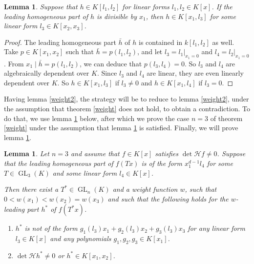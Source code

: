 \documentclass[10pt]{article}
\newtheorem{lemma}[theorem]{Lemma}
\theoremstyle{remark}
\theoremstyle{definition}
\newcommand{\hess}{{\mathcal H}}
\newcommand{\GL}{\operatorname{GL}}
\begin{document}
\begin{lemma} \label{xkdiv}
Suppose that $h \in K[l_1,l_2]$ for linear forms $l_1, l_2 \in K[x]$.
If the leading homogeneous part of $h$ is divisible by $x_1$, then $h \in K[x_1,l_3]$
for some linear form $l_3 \in K[x_2,x_3]$.
\end{lemma}

\begin{proof}
The leading homogeneous part $\bar{h}$ of $h$ is contained in $k[l_1,l_2]$ as well.
Take $p \in K[x_1,x_2]$ such that $\bar{h} = p(l_1,l_2)$, and let $l_3 = l_1|_{x_1=0}$
and $l_4 = l_2|_{x_1=0}$. From $x_1 \mid \bar{h} = p(l_1,l_2)$, we can deduce that
$p(l_3,l_4) = 0$. So $l_3$ and $l_4$ are algebraically dependent over $K$.
Since $l_3$ and $l_4$ are linear, they are even linearly dependent over $K$.
So $h \in K[x_1,l_3]$ if $l_3 \ne 0$ and $h \in K[x_1,l_4]$ if $l_3 = 0$.
\end{proof}

Having lemma \ref{weight2}, the strategy will be to reduce to lemma \ref{weight2}, under
the assumption that theorem \ref{weight} does not hold, to obtain a contradiction. To do that,
we use lemma \ref{weight1} below, after which we prove the case $n=3$ of theorem \ref{weight}
under the assumption that lemma \ref{weight1} is satisfied. Finally, we will prove lemma 
\ref{weight1}.

\begin{lemma} \label{weight1}
Let $n = 3$ and assume that $f \in K[x]$ satisfies $\det \hess f \ne 0$. Suppose that
the leading homogeneous part of $f(Tx)$ is of
the form $x_1^{d-1} l_4$ for some $T \in \GL_3(K)$ and some linear form $l_4 \in K[x]$.

Then there exist a $T^{*} \in \GL_n(K)$ and a weight function $w$, such that 
$0 < w(x_1) < w(x_2) = w(x_3)$ and such that the following holds for the
$w$-leading part $h^{*}$ of $f(T^{*}x)$.
\begin{enumerate}

\item[a)] $h^{*}$ is not of the form $g_1(l_3) x_1 + g_2(l_3) x_2 + g_3(l_3)x_3$ for any
linear form $l_3 \in K[x]$ and any polynomials $g_1, g_2, g_3 \in K[x_1]$.

\item[b)] $\det \hess h^{*} \ne 0$ or $h^{*} \in K[x_1,x_2]$.

\end{enumerate}
\end{lemma}
\end{document}
